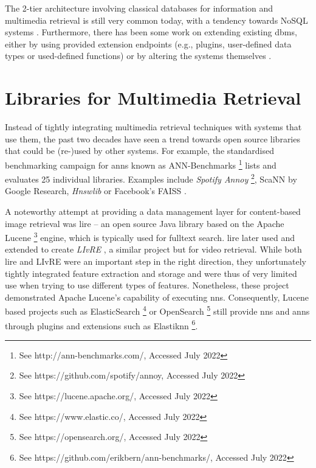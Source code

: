 The 2-tier architecture involving classical databases for information and multimedia retrieval is still very common today, with a tendency towards NoSQL systems \cite{Muhleisen:2014Old,Oliveira:2017Performance}. Furthermore, there has been some work on extending existing \acrshort{dbms}, either by using provided extension endpoints (e.g., plugins, user-defined data types or used-defined functions) or by altering the systems themselves \cite{Whang:2010Tightly,Giangreco:2014Adam,Whang:2015DB,Yang:2020Pase}.

\section{Libraries for Multimedia Retrieval}

Instead of tightly integrating multimedia retrieval techniques with systems that use them, the past two decades have seen a trend towards open source libraries that could be (re-)used by other systems. For example, the standardised benchmarking campaign for \acrshort{anns} known as ANN-Benchmarks \cite{Aumueller:2017ANN} \footnote{See http://ann-benchmarks.com/, Accessed July 2022} lists and evaluates 25 individual libraries. Examples include \emph{Spotify Annoy} \footnote{See https://github.com/spotify/annoy, Accessed July 2022}, ScaNN \cite{Guo:2020Accelerating} by Google Research, \emph{Hnswlib} \cite{Malkov:2018Efficient} or Facebook's FAISS \cite{Johnson:2019Billion}.

A noteworthy attempt at providing a data management layer for content-based image retrieval was \acrfull{lire} \cite{Luc:2008LIRE} -- an open source Java library based on the Apache Lucene \footnote{See https://lucene.apache.org/, Accessed July 2022} engine, which is typically used for fulltext search. \acrshort{lire} later used and extended to create \emph{LIvRE} \cite{Oliveira:2016Large}, a similar project but for video retrieval. While both \acrshort{lire} and LIvRE were an important step in the right direction, they unfortunately tightly integrated feature extraction and storage and were thus of very limited use when trying to use different types of features. Nonetheless, these project demonstrated Apache Lucene's capability of executing \acrshort{nns}. Consequently, Lucene based projects such as ElasticSearch \footnote{See https://www.elastic.co/, Accessed July 2022} or OpenSearch \footnote{See https://opensearch.org/, Accessed July 2022} still provide \acrshort{nns} and \acrshort{anns} through plugins and extensions such as Elastiknn \footnote{See https://github.com/erikbern/ann-benchmarks/, Accessed July 2022}.

